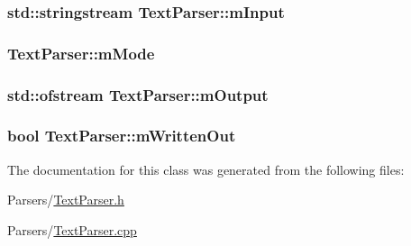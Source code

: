 \subsubsection[{\texorpdfstring{m\+Input}{mInput}}]{\setlength{\rightskip}{0pt plus 5cm}std\+::stringstream Text\+Parser\+::m\+Input\hspace{0.3cm}{\ttfamily [private]}}\hypertarget{classTextParser_aa18a207bceefbfe78e70dab14e2af6e7}{}\label{classTextParser_aa18a207bceefbfe78e70dab14e2af6e7}
\subsubsection[{\texorpdfstring{m\+Mode}{mMode}}]{ Text\+Parser\+::m\+Mode\hspace{0.3cm}{\ttfamily [private]}}\hypertarget{classTextParser_a4402e5628f927e1e7078d211bc0ac35c}{}\label{classTextParser_a4402e5628f927e1e7078d211bc0ac35c}
\subsubsection[{\texorpdfstring{m\+Output}{mOutput}}]{\setlength{\rightskip}{0pt plus 5cm}std\+::ofstream Text\+Parser\+::m\+Output\hspace{0.3cm}{\ttfamily [private]}}\hypertarget{classTextParser_a32aec422aa1445456603e8ea7f34aa4d}{}\label{classTextParser_a32aec422aa1445456603e8ea7f34aa4d}
\subsubsection[{\texorpdfstring{m\+Written\+Out}{mWrittenOut}}]{\setlength{\rightskip}{0pt plus 5cm}bool Text\+Parser\+::m\+Written\+Out\hspace{0.3cm}{\ttfamily [private]}}\hypertarget{classTextParser_aa8f0a8b2c17891006c1d6cf1041053ef}{}\label{classTextParser_aa8f0a8b2c17891006c1d6cf1041053ef}


The documentation for this class was generated from the following files\+:\begin{DoxyCompactItemize}
\item 
Parsers/\hyperlink{TextParser_8h}{Text\+Parser.\+h}\item 
Parsers/\hyperlink{TextParser_8cpp}{Text\+Parser.\+cpp}\end{DoxyCompactItemize}

